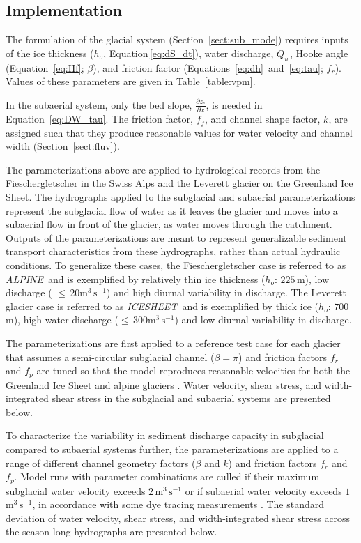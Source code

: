 \documentclass[11pt]{article}
\newcommand{\alpine}{\textit{ALPINE}\,}
\newcommand{\icesheet}{\textit{ICESHEET}\,}
\newcommand{\unit}[1]{$\mathrm{#1}$}
\begin{document}
\subsection{Implementation}

The formulation of the glacial system (Section~\ref{sect:sub_mode}) requires inputs of the ice thickness ($h_o$, Equation\,\ref{eq:dS_dt}), water discharge, $Q_w$,  Hooke angle (Equation~\ref{eq:Hf}; $\beta$), and friction factor (Equations~\ref{eq:dh}~and~\ref{eq:tau}; $f_r$). Values of these parameters are given in Table~\ref{table:vpm}.

In the subaerial system,  only the bed slope, $\frac{\partial z_c}{\partial x}$, is needed in Equation~\ref{eq:DW_tau}. The friction factor, $f_f$, and channel shape factor, $k$, are assigned such that they produce reasonable values for water velocity and channel width  (Section~\ref{sect:fluv}).

The parameterizations above are applied to hydrological records from the Fieschergletscher in the Swiss Alps and the Leverett glacier on the Greenland Ice Sheet.
The hydrographs applied to the subglacial and subaerial parameterizations represent the subglacial flow of water as it leaves the glacier and moves into a subaerial flow in front of the glacier, as water moves through the catchment.
Outputs of the parameterizations are meant to represent generalizable sediment transport characteristics from these hydrographs, rather than actual hydraulic conditions.
To generalize these cases, the Fieschergletscher case is referred to as \alpine{} and is exemplified by relatively thin ice thickness ($h_o$: $225$\,\unit{m}), low discharge ( $\le\,20$\unit{m}$^3$\,\unit{s}$^{-1}$) and high diurnal variability in discharge.
The Leverett glacier case is referred to as \icesheet{} and is exemplified by thick ice  ($h_o$: $700$\,\unit{m}), high water discharge ($\le\,300$\unit{m}$^3$\,\unit{s}$^{-1}$)  and low diurnal variability in discharge.

The parameterizations are first applied to a reference test case for each glacier that assumes a semi-circular subglacial channel ($\beta=\pi$) and friction factors $f_r$ and $f_p$ are tuned so that the model reproduces reasonable velocities for both  the Greenland Ice Sheet and alpine glaciers \citep[$\sim\,1.6\,$\unit{m}$^3$\,\unit{s}$^{-1}$][]{werder2010b,chandler2013}.
Water velocity, shear stress, and width-integrated shear stress in the subglacial and subaerial systems are presented below.

To characterize the variability in sediment discharge capacity in subglacial compared to subaerial systems further, the parameterizations are applied to a range of different channel geometry factors ($\beta$ and $k$) and friction factors $f_r$ and $f_p$.
Model runs with parameter combinations  are culled if their maximum subglacial water velocity exceeds $2\,$\unit{m}$^3$\,\unit{s}$^{-1}$ or if subaerial water velocity exceeds $1\,$\unit{m}$^3$\,\unit{s}$^{-1}$, in accordance with some dye tracing measurements \citep[e.g.]{werder2010b,chandler2013}.
The standard deviation of water velocity, shear stress, and width-integrated shear stress across the season-long hydrographs are presented below.
\end{document}
